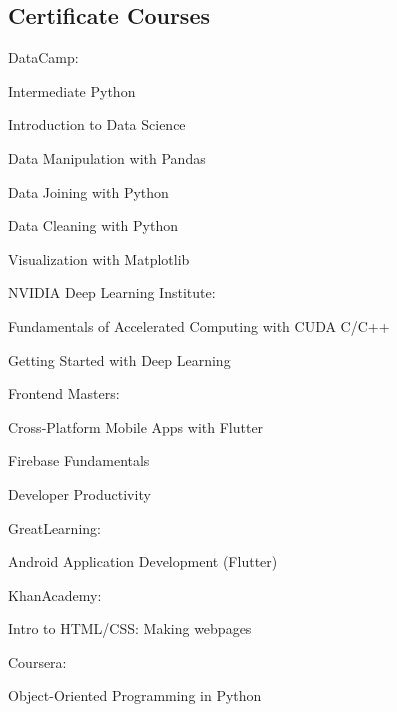 \documentclass[]{m abbas resume' 2022}
\begin{document}
\begin{minipage}[t]{0.53\textwidth}
    \subsection{Certificate Courses}
    DataCamp:
    \begin{tightemize}
        \item Intermediate Python
        \item Introduction to Data Science
        \item Data Manipulation with Pandas
        \item Data Joining with Python
        \item Data Cleaning with Python
        \item Visualization with Matplotlib
    \end{tightemize}
    NVIDIA Deep Learning Institute:
    \begin{tightemize}
        \item Fundamentals of Accelerated Computing with CUDA C/C++
        \item Getting Started with Deep Learning
    \end{tightemize}
    Frontend Masters:
    \begin{tightemize}
        \item Cross-Platform Mobile Apps with Flutter
        \item Firebase Fundamentals
        \item Developer Productivity
    \end{tightemize}
    GreatLearning:
    \begin{tightemize}
        \item Android Application Development (Flutter)
    \end{tightemize}
    KhanAcademy:
    \begin{tightemize}
        \item Intro to HTML/CSS: Making webpages
    \end{tightemize}
    Coursera:
    \begin{tightemize}
        \item Object-Oriented Programming in Python
    \end{tightemize}
    \sectionsep
    
    

\end{minipage}
\end{document}
